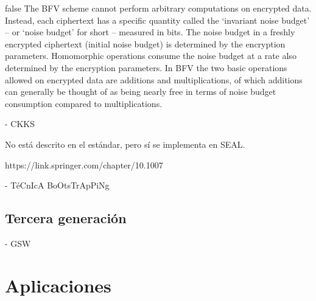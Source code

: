 \if false
The BFV scheme cannot perform arbitrary computations on encrypted data.
    Instead, each ciphertext has a specific quantity called the `invariant noise
    budget' -- or `noise budget' for short -- measured in bits. The noise budget
    in a freshly encrypted ciphertext (initial noise budget) is determined by
    the encryption parameters. Homomorphic operations consume the noise budget
    at a rate also determined by the encryption parameters. In BFV the two basic
    operations allowed on encrypted data are additions and multiplications, of
    which additions can generally be thought of as being nearly free in terms of
    noise budget consumption compared to multiplications.
\fi


- CKKS

No está descrito en el estándar, pero sí se implementa en SEAL.

https://link.springer.com/chapter/10.1007%

- TéCnIcA BoOtsTrApPiNg



\subsection{Tercera generación}

- GSW

\section{Aplicaciones}

